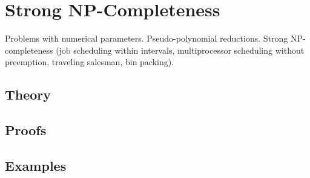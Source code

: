 
\section{Strong NP-Completeness}
\label{sec:2.3a.13-strong-np-completeness}

\begin{ticket}
Problems with numerical parameters. Pseudo-polynomial reductions. Strong NP-completeness (job scheduling within intervals, multiprocessor scheduling without preemption, traveling salesman, bin packing).
\end{ticket}

\subsection*{Theory}

\subsection*{Proofs}

\subsection*{Examples}
